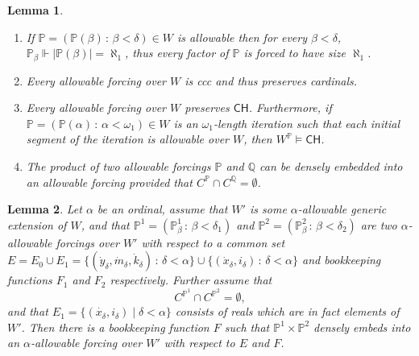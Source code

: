 \documentclass[10pt,a4paper]{amsart}
\newtheorem{lemma}{Lemma}
\newcommand{\CH}{\mathsf{CH}}
\newcommand{\forceP}{\mathbb{P}}
\newcommand{\forceQ}{\mathbb{Q}}
\begin{document}
 \begin{lemma} \label{FirstPropertiesOfAllowableForcings}


\begin{enumerate}
\item If $\forceP=(\forceP(\beta) \, : \, \beta < \delta) \in W$ is allowable then for every $\beta < \delta$, $\forceP_{\beta} \Vdash| \forceP(\beta)|= \aleph_1$, thus every factor of $\forceP$ is forced to have size $\aleph_1$.
\item Every allowable forcing over $W$ is ccc and thus preserves cardinals.
\item Every allowable forcing over $W$ preserves $\CH$. Furthermore, if $\forceP= (\forceP(\alpha) \, : \, \alpha < \omega_1) \in W$ is an $\omega_1$-length iteration such that each initial segment of the iteration is allowable over $W$, then $W^{\forceP} \models \CH$.
\item The product of two allowable forcings $\forceP$ and $\forceQ$ can be densely embedded into an allowable forcing provided that $C^{\forceP} \cap C^{\forceQ}=\emptyset$.
\end{enumerate}
\end{lemma}

\begin{lemma}\label{productallowable}
Let $\alpha$ be an ordinal, assume that $W'$ is some $\alpha$-allowable generic extension of $W$, and that $\forceP^1=(\forceP^1_{\beta} \,: \,\beta < \delta_1)$ and $\forceP^2=(\forceP^2_{\beta} \,: \, \beta < \delta_2) $ are two $\alpha$-allowable forcings over $W'$ with respect to a common set $E=E_0 \cup E_1=\{(\dot{y}_{\delta},\dot{m}_{\delta}, \dot{k}_{\delta}) \,: \, \delta < \alpha\} \cup \{ (\dot{x}_{\delta},i_{\delta}) \, : \, \delta < \alpha \}$  and bookkeeping functions $F_1$ and $F_2$ respectively. Further assume that 
\[ C^{\forceP^1} \cap C^{\forceP^2} = \emptyset, \]
and that $E_1= \{ (\dot{x_{\delta}},i_{\delta}) \mid \delta < \alpha \}$ consists of reals which are in fact elements of $W'$.
Then there is a bookkeeping function $F$ such that $\forceP^1 \times \forceP^2$ densely embeds into an $\alpha$-allowable forcing over $W'$ with respect to $E$ and $F$.
\end{lemma}
\end{document}
